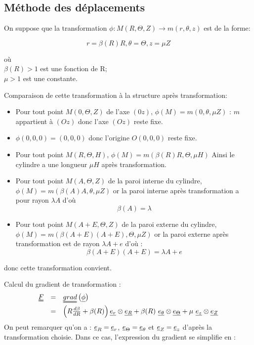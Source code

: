 \documentclass[a4paper,11pt]{article}
\newcommand{\tens}{\uuline}
\begin{document}
\subsection{Méthode des déplacements}
On suppose que la transformation $\phi : M(R,\Theta, Z) \rightarrow m(r, \theta, z)$ est de la forme:

$$r=\beta(R)R, \theta=\Theta, z=\mu Z$$

\begin{flushleft}
où\\
$\beta(R)>1$ est une fonction de R;\\
$\mu>1$ est une constante.
\end{flushleft}

Comparaison de cette transformation à la structure après transformation:
\begin{itemize}
\item Pour tout point $M(0, \Theta, Z)$ de l'axe $(0z)$, $\phi(M) = m(0, \theta, \mu Z)$ : $m$ appartient à $(Oz)$ donc l'axe $(Oz)$ reste fixe.
\item $\phi (0, 0, 0) = (0, 0, 0)$ donc l'origine $O(0, 0, 0)$ reste fixe.
\item Pour tout point $M(R, \Theta, H)$,  $\phi(M) = m(\beta (R) R, \Theta, \mu H)$ Ainsi le cylindre a une longueur $\mu H$ après transformation.
\item Pour tout point $M(A, \Theta, Z)$ de la paroi interne du cylindre, $\phi(M) = m(\beta(A) A, \theta, \mu Z)$ or la paroi interne après transformation a pour rayon $\lambda A$ d'où
\begin{equation}
\beta(A) = \lambda
\label{eq:condition_limite_beta}
\end{equation}
\item Pour tout point $M(A+E, \Theta, Z)$ de la paroi externe du cylindre, $\phi(M) = m(\beta(A+E) (A+E), \Theta, \mu Z)$ or la paroi externe après transformation est de rayon $\lambda A + e$ d'où :
$$\beta(A+E)(A+E) = \lambda A+ e$$
\end{itemize}
donc cette transformation convient.

Calcul du gradient de transformation :
$$
\begin{array}{rcl}
\tens{F} &=& \tens{grad} \left(\uline{\phi}\right)\\
&=& \left(R\frac{d\beta}{dR} +\beta(R)\right) \uline{e_r}\otimes \uline{e_R} + \beta(R)\ \uline{e_\theta}\otimes \uline{e_\Theta} + \mu\ \uline{e_z}\otimes \uline{e_Z}
\end{array}
$$
On peut remarquer qu'on a : $\uline{e}_{R} = \uline{e}_{r}$, $\uline{e}_{\Theta} = \uline{e}_{\theta}$ et $\uline{e}_{Z} = \uline{e}_{z}$ d'après la transformation choisie. Dans ce cas, l'expression du gradient se simplifie en :
\end{document}
